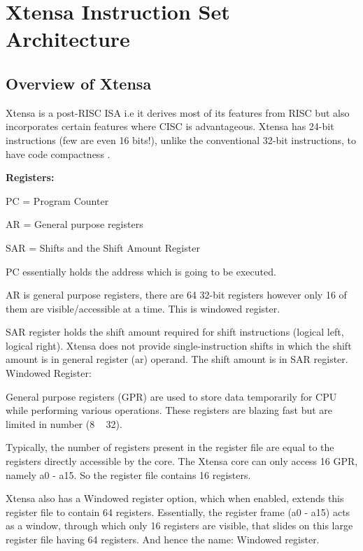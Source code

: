 \chapter{Xtensa Instruction Set Architecture}
\pagestyle{plain}
\setlength{\parindent}{2em}
\setlength{\parskip}{1em}

\section{Overview of Xtensa}


Xtensa is a post-RISC ISA i.e it derives most of its features from RISC but also incorporates 
certain features where CISC is advantageous. Xtensa has 24-bit instructions (few are even 16 bits!),
unlike the conventional 32-bit instructions, to have code compactness \cite{leibson2006designing, tensilica2008whitepaper}.

  \textbf{Registers:}

  PC = Program Counter

  AR = General purpose registers

  SAR = Shifts and the Shift Amount Register

  PC essentially holds the address which is going to be executed.

  AR is general purpose registers, there are 64 32-bit registers however only 16 of them are 
visible/accessible at a time. This is windowed register.

  SAR register holds the shift amount required for shift instructions (logical left, logical right). 
Xtensa does not provide single-instruction shifts in which the shift amount is in general register 
(ar) operand. The shift amount is in SAR register.
  Windowed Register:

  General purpose registers (GPR) are used to store data temporarily for CPU while performing various operations. These registers are blazing fast but are limited in number (8 ~ 32).

  Typically, the number of registers present in the register file are equal to the registers directly accessible by the core. The Xtensa core can only access 16 GPR, namely a0 - a15. So the register file contains 16 registers.

  Xtensa also has a Windowed register option, which when enabled, extends this register file to contain 64 registers. Essentially, the register frame (a0 - a15) acts as a window, through which only 16 registers are visible, that slides on this large register file having 64 registers. And hence the name: Windowed register.

